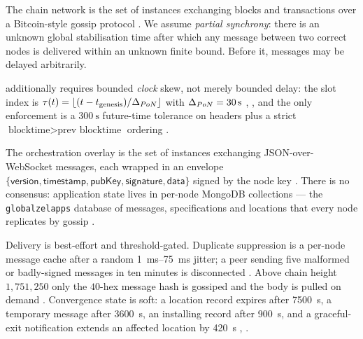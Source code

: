 \begin{definition}
\label{def:chainnet}
\shipped The chain network is the set of \fluxd{} instances exchanging blocks and transactions over a
Bitcoin-style gossip protocol . We assume
\emph{partial synchrony}: there is an unknown global stabilisation time after which any message
between two correct nodes is delivered within an unknown finite bound. Before it, messages may be
delayed arbitrarily.

\PoN{} additionally requires bounded \emph{clock} skew, not merely bounded delay: the slot index is
$\tau(t) = \lfloor (t - t_{\mathrm{genesis}})/\Delta_{PoN} \rfloor$ with
$\Delta_{PoN} = \qty{30}{\second}$ ,
, and the only enforcement is a
$\qty{300}{\second}$ future-time tolerance on \PoN{} headers plus a strict
$\text{blocktime} > \text{prev blocktime}$ ordering
.
\end{definition}

\begin{definition}
\label{def:overlay}
\shipped The orchestration overlay is the set of \FluxOS{} instances exchanging JSON-over-WebSocket
messages, each wrapped in an envelope
$\{\textsf{version}, \textsf{timestamp}, \textsf{pubKey}, \textsf{signature}, \textsf{data}\}$ signed
by the node key . There is no
consensus: application state lives in per-node MongoDB collections --- the \texttt{globalzelapps}
database of messages, specifications and locations that every node replicates by gossip
.

Delivery is best-effort and threshold-gated. Duplicate suppression is a per-node message cache after
a random \qty{1}{\milli\second}--\qty{75}{\milli\second} jitter; a peer sending five malformed or
badly-signed messages in ten minutes is disconnected
. Above chain height $1{,}751{,}250$
only the $40$-hex message hash is gossiped and the body is pulled on demand
. Convergence state is soft: a
location record expires after \qty{7500}{\second}, a temporary message after \qty{3600}{\second}, an
installing record after \qty{900}{\second}, and a graceful-exit notification extends an affected
location by \qty{420}{\second} ,
.
\end{definition}

